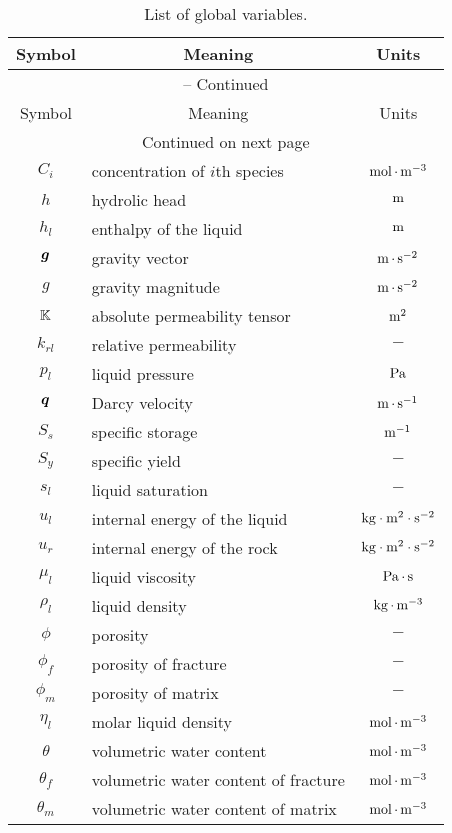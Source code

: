 \begin{center}
\begin{longtable}{cp{7cm}c}
\caption{List of global variables.} \label{table:flow-list-of-variables} \\

\multicolumn{1}{c}{Symbol} & \multicolumn{1}{c}{Meaning} & \multicolumn{1}{c}{Units} \\
\hline  \hline 
\endfirsthead

\multicolumn{3}{c}{{\tablename} \thetable{} -- Continued} \\
\multicolumn{1}{c}{Symbol} & \multicolumn{1}{c}{Meaning} & \multicolumn{1}{c}{Units} \\
\hline  \hline 
\endhead

\hline \multicolumn{3}{c}{{Continued on next page}} \\ 
\hline \hline 
\endfoot

\hline \hline
\endlastfoot

$C_i$      & concentration of $i$th species    &  ${\rm mol}{\,\cdot\,}{\rm m}^{-3}$ \\
$h$        & hydrolic head        &  ${\rm m}$  \\
$h_l$      & enthalpy of the liquid        &  ${\rm m}$  \\
${\boldsymbol{g}}$      & gravity vector       &  ${\rm m}{\,\cdot\,}{\rm s}^{-2}$  \\
$g$        & gravity magnitude    &  ${\rm m}{\,\cdot\,}{\rm s}^{-2}$  \\
${\mathbb K}$       & absolute permeability tensor & ${\rm m}^2$ \\
$k_{rl}$   & relative permeability&  $-$ \\
$p_l$      & liquid pressure      &  ${\rm Pa}$ \\
${\boldsymbol{q}}$      & Darcy velocity       &  ${\rm m}{\,\cdot\,}{\rm s}^{-1}$  \\
$S_s$      & specific storage     &  ${\rm m}^{-1}$  \\
$S_y$      & specific yield       &  $-$  \\
$s_l$      & liquid saturation    &  $-$ \\
$u_l$      & internal energy of the liquid   &  ${\rm kg}\cdot{\rm m}^2\cdot {\rm s}^{-2}$ \\
$u_r$      & internal energy of the rock     &  ${\rm kg}\cdot{\rm m}^2\cdot {\rm s}^{-2}$  \\
\hline
$\mu_l$    & liquid viscosity     &  ${\rm Pa}{\,\cdot\,}{\rm s}$ \\
$\rho_l$   & liquid density       &  ${\rm kg}{\,\cdot\,}{\rm m}^{-3}$ \\
$\phi$     & porosity             &  $-$  \\
$\phi_f$   & porosity of fracture &  $-$  \\
$\phi_m$   & porosity of matrix   &  $-$  \\
$\eta_l$   & molar liquid density &  ${\rm mol}{\,\cdot\,}{\rm m}^{-3}$ \\
$\theta$   & volumetric water content  &  ${\rm mol}{\,\cdot\,}{\rm m}^{-3}$ \\
$\theta_f$ & volumetric water content of fracture &  ${\rm mol}{\,\cdot\,}{\rm m}^{-3}$ \\
$\theta_m$ & volumetric water content of matrix   &  ${\rm mol}{\,\cdot\,}{\rm m}^{-3}$ \\


\end{longtable}
\end{center}
